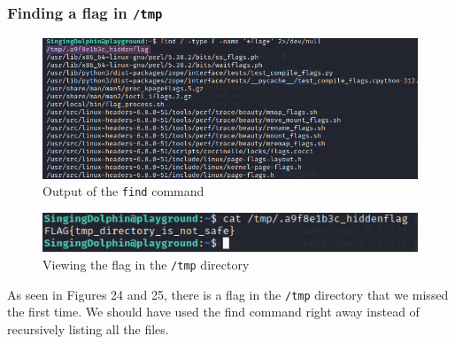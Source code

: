 \documentclass[a4paper]{article}
\newcommand{\abc}{\hfill \break}
\begin{document}
\subsubsection{Finding a flag in \texttt{/tmp}}
\begin{figure}[h]
	\includegraphics[scale=0.45]{images/fdtmp.png}
	\centering
	\caption[Outout of the find command]{Output of the \texttt{find} command \footnotemark}
\end{figure}\abc
{}
\begin{figure}[h]
	\includegraphics[scale=0.7]{images/tmpfl.png}
	\centering
	\caption{Viewing the flag in the \texttt{/tmp} directory}
\end{figure}\abc
As seen in Figures 24 and 25, there is a flag in the \texttt{/tmp} directory that we missed the first time. We should have used the find command right away instead of recursively listing all the files.
\newpage
\end{document}
